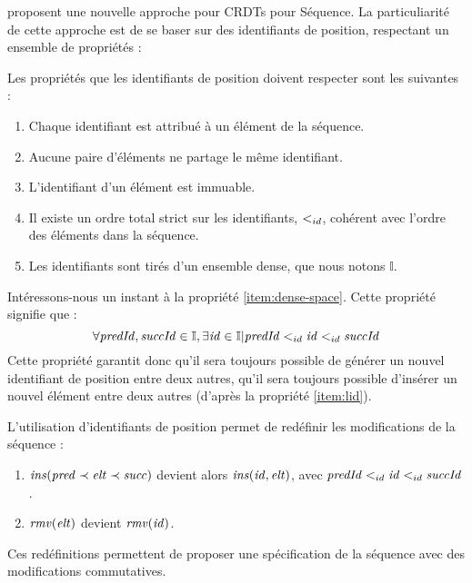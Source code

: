 \cite{2007-crdt-shapiro, 2009-treedoc-preguica} proposent une nouvelle approche pour CRDTs pour Séquence.
La particuliarité de cette approche est de se baser sur des identifiants de position, respectant un ensemble de propriétés :
\begin{definition}
  Les propriétés que les identifiants de position doivent respecter sont les suivantes :
  \begin{enumerate}[label=(\roman*)]
    \item Chaque identifiant est attribué à un élément de la séquence.
    \item \label{item:uniqueness}
      Aucune paire d'éléments ne partage le même identifiant.
    \item L'identifiant d'un élément est immuable.
    \item \label{item:lid}
      Il existe un ordre total strict sur les identifiants, $<_{id}$, cohérent avec l'ordre des éléments dans la séquence.
    \item \label{item:dense-space}
      Les identifiants sont tirés d'un ensemble dense, que nous notons $\mathbb{I}$.
  \end{enumerate}
\end{definition}

Intéressons-nous un instant à la propriété \ref{item:dense-space}.
Cette propriété signifie que :
\begin{equation*}
  \forall \mathit{predId}, \mathit{succId} \in \mathbb{I}, \exists \mathit{id} \in \mathbb{I} | \mathit{predId} <_{id} \mathit{id} <_{id} \mathit{succId}
\end{equation*}
Cette propriété garantit donc qu'il sera toujours possible de générer un nouvel identifiant de position entre deux autres, \ie qu'il sera toujours possible d'insérer un nouvel élément entre deux autres (d'après la propriété \ref{item:lid}).

L'utilisation d'identifiants de position permet de redéfinir les modifications de la séquence :
\begin{enumerate}[label=(\roman*)]
  \item $\mathit{ins}(\mathit{pred} \prec \mathit{elt} \prec \mathit{succ})$ devient alors $\mathit{ins}(\mathit{id}, \mathit{elt})$, avec $\mathit{predId} <_{id} \mathit{id} <_{id} \mathit{succId}$.
  \item $\mathit{rmv}(\mathit{elt})$ devient $\mathit{rmv}(\mathit{id})$.
\end{enumerate}
Ces redéfinitions permettent de proposer une spécification de la séquence avec des modifications commutatives.

